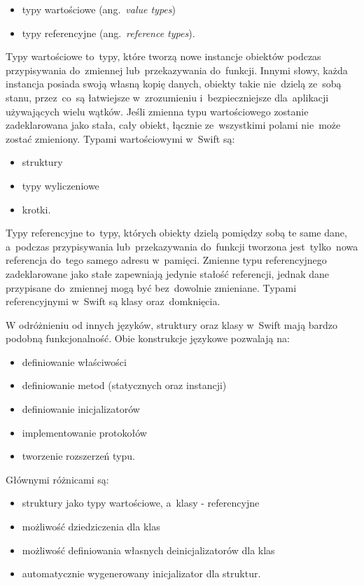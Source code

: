 \documentclass[mgr, shortabstract]{iithesis}
\newcommand{\ang}[1]{ang.~\textit{#1}}
\begin{document}
\begin{itemize}
    \item typy wartościowe (\ang{value types})
    \item typy referencyjne (\ang{reference types}).
\end{itemize}

Typy wartościowe to~typy, które tworzą nowe instancje obiektów podczas przypisywania do~zmiennej lub~przekazywania do~funkcji. Innymi słowy, każda instancja posiada swoją własną kopię danych, obiekty takie nie~dzielą ze~sobą stanu, przez~co~są łatwiejsze w~zrozumieniu i~bezpieczniejsze dla~aplikacji używających wielu wątków. Jeśli zmienna typu wartościowego zostanie zadeklarowana jako stała, cały obiekt, łącznie ze~wszystkimi polami nie~może zostać zmieniony. Typami wartościowymi w~Swift są:

\begin{itemize}
    \item struktury
    \item typy wyliczeniowe
    \item krotki.
\end{itemize}

Typy referencyjne to~typy, których obiekty dzielą pomiędzy sobą te same dane, a~podczas przypisywania lub~przekazywania do~funkcji tworzona jest~tylko~nowa referencja do~tego samego adresu w~pamięci. Zmienne typu referencyjnego zadeklarowane jako stałe zapewniają jedynie stałość referencji, jednak dane przypisane do~zmiennej mogą być bez~dowolnie zmieniane. Typami referencyjnymi w~Swift są klasy oraz~domknięcia.

W odróżnieniu od innych języków, struktury oraz klasy w~Swift mają bardzo podobną funkcjonalność. Obie konstrukcje językowe pozwalają na:

\begin{itemize}
    \item definiowanie właściwości
    \item definiowanie metod (statycznych oraz instancji)
    \item definiowanie inicjalizatorów
    \item implementowanie protokołów
    \item tworzenie rozszerzeń typu.
\end{itemize}

Głównymi różnicami są:

\begin{itemize}
    \item struktury jako typy wartościowe, a~klasy - referencyjne
    \item możliwość dziedziczenia dla klas
    \item możliwość definiowania własnych deinicjalizatorów dla klas
    \item automatycznie wygenerowany inicjalizator dla struktur.
\end{itemize}
\end{document}
